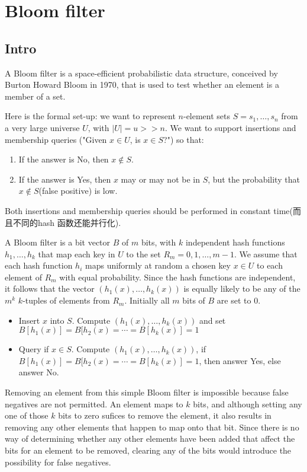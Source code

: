 \chapter{Bloom filter}
\section{Intro}
A Bloom filter is a space-efficient probabilistic data structure, conceived by Burton Howard Bloom in 1970, that is used to test whether an element is a member of a set.

Here is the formal set-up: we want to represent $n$-element sets $S = {s_1, \ldots, s_n}$ from a very large universe $U$, with $|U| = u >> n$. 
We want to support insertions and membership queries ("Given $x \in U$, is $x \in S$?") so that:
\begin{enumerate}
\item If the answer is No, then $x \notin S$.
\item If the answer is Yes, then $x$ may or may not be in $S$, but the probability that $x \notin S$(false positive) is low.
\end{enumerate}
Both insertions and membership queries should be performed in constant time(而且不同的hash 函数还能并行化).

A Bloom filter is a bit vector $B$ of $m$ bits, with $k$ independent hash functions $h_1, \ldots, h_k$ that map each key in $U$ to the set $R_m = {0, 1, \ldots, m − 1}$.
We assume that each hash function $h_i$ maps uniformly at random a chosen key $x \in U$ to each element of $R_m$ with equal probability.
Since the hash functions are independent, it follows that the vector $(h_1(x), \ldots, h_k(x))$ is equally likely to be any of the $m^k$ $k$-tuples of elements from $R_m$.
Initially all $m$ bits of $B$ are set to $0$.

\begin{itemize}
\item Insert $x$ into $S$. Compute $(h_1(x), \ldots, h_k(x))$ and set $B[h_1(x)] = B[h_2(x) = \cdots = B[h_k(x)] = 1$
\item Query if $x \in S$. Compute $(h_1(x), \ldots, h_k(x))$, if $B[h_1(x)] = B[h_2(x) = \cdots = B[h_k(x)] = 1$, then answer Yes, else answer No.
\end{itemize}

Removing an element from this simple Bloom filter is impossible because false negatives are not permitted.
An element maps to $k$ bits, and although setting any one of those $k$ bits to zero sufices to remove the element, it also results in removing any other elements that happen to map onto that bit.
Since there is no way of determining whether any other elements have been added that affect the bits for an element to be removed, clearing any of the bits would introduce the possibility for false negatives.

